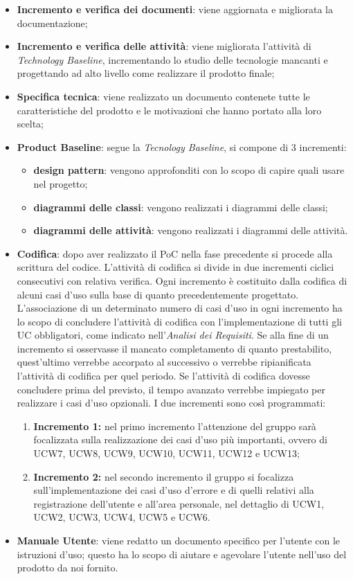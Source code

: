 \begin{itemize}
	\item \textbf{Incremento e verifica dei documenti}: viene aggiornata e migliorata la documentazione;
	\item \textbf{Incremento e verifica delle attività}: viene migliorata l’attività di \textit{Technology Baseline},  incrementando lo studio delle tecnologie mancanti e progettando ad alto livello come realizzare il prodotto finale;
	\item \textbf{Specifica tecnica}: viene realizzato un documento contenete tutte le caratteristiche del prodotto e le motivazioni che hanno portato alla loro scelta;
	\item \textbf{Product Baseline}: segue la \textit{Tecnology Baseline},  si compone di 3 incrementi:
		\begin{itemize}
			\item \textbf{design pattern\glo{}}: vengono approfonditi con lo scopo di capire quali usare nel progetto;
			\item \textbf{diagrammi delle classi}: vengono realizzati i diagrammi delle classi;
			\item \textbf{diagrammi delle attività}: vengono realizzati i diagrammi delle attività.
		\end{itemize}
	\item \textbf{Codifica}: dopo aver realizzato il PoC nella fase precedente si procede alla scrittura del codice.  L'attività di codifica si divide in due incrementi ciclici consecutivi con relativa verifica.  Ogni incremento è costituito dalla codifica di alcuni casi d'uso\glo{} sulla base di quanto precedentemente progettato.  L’associazione di un determinato numero di casi d’uso in ogni incremento ha lo scopo di concludere l'attività di codifica con l’implementazione di tutti gli UC obbligatori,  come indicato nell'\textit{Analisi dei Requisiti}.  Se alla fine di un incremento si osservasse il mancato completamento di quanto prestabilito,  quest’ultimo verrebbe accorpato al successivo o verrebbe ripianificata l’attività di codifica per quel periodo.  Se l'attività di codifica dovesse concludere prima del previsto,  il tempo avanzato verrebbe impiegato per realizzare i casi d'uso opzionali.  I due incrementi sono così programmati:
		\begin{enumerate}
			\item \textbf{Incremento 1:} nel primo incremento l'attenzione del gruppo sarà focalizzata sulla realizzazione dei casi d'uso più importanti,  ovvero di UCW7,  UCW8,  UCW9,  UCW10,  UCW11,  UCW12 e UCW13;
			\item \textbf{Incremento 2:} nel secondo incremento il gruppo si focalizza sull'implementazione dei casi d'uso d'errore e di quelli relativi alla registrazione dell'utente e all'area personale,  nel dettaglio di UCW1,  UCW2,  UCW3,  UCW4,  UCW5 e UCW6.  
		\end{enumerate}
	\item \textbf{Manuale Utente}: viene redatto un documento specifico per l'utente con le istruzioni d'uso; questo ha lo scopo di aiutare e agevolare l’utente nell’uso del prodotto da noi fornito.
\end{itemize}

